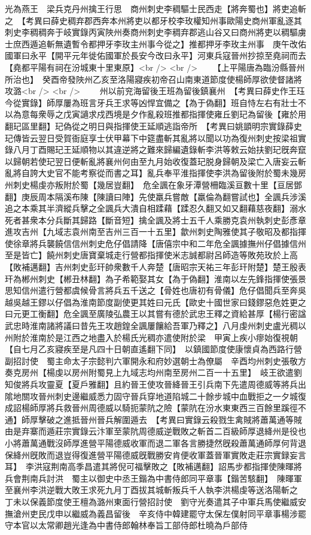 光為燕王　梁兵克丹州擒王行思　商州刺史李稠驅士民西走【將奔蜀也】將吏追斬之　【考異曰薛史稠弃郡西奔本州將吏以都牙校李玫權知州事歐陽史商州軍亂逐其刺史李稠稠奔于岐實錄丙寅陜州奏商州刺史李稠弃郡逃山谷又曰商州將吏以稠驅虜士庶西遁追斬無遺暫令都押牙李玫主州事今從之】推都押牙李玫主州事　庚午改佑國軍曰永平【開平元年徙佑國軍於長安今改曰永平】河東兵寇晉州抄掠至堯祠而去【堯都平陽有祠在汾城東十里東原】<br />
<br />
　　【上平陽唐為臨汾縣晉州所治也】　癸酉帝發陜州乙亥至洛陽寢疾初帝召山南東道節度使楊師厚欲使督諸將攻潞<br />
<br />
　　州以前兖海留後王班為留後鎮襄州　【考異曰薛史作王珏今從實錄】師厚屢為班言牙兵王求等凶悍宜備之【為于偽翻】班自恃左右有壯士不以為意每衆辱之戊寅讁求戍西境是夕作亂殺班推都指揮使雍丘劉玘為留後【雍於用翻玘區里翻】玘偽從之明日與指揮使王延順逃詣帝所　【考異曰姚顗明宗實錄薛史玘傳皆云翌日受賀衙庭享士伏甲幕下中筵盡斬其亂將以聞以功為復州刺史按梁祖實錄八月丁酉賜玘王延順物以其違逆將之難來歸編遺錄斬李洪等敕云始扶劉玘旣奔竄以歸朝若使玘翌日便斬亂將襄州何由至九月始收復蓋玘脱身歸朝及梁亡入唐妄云斬亂將自誇大史官不能考察從而書之耳】亂兵奉平淮指揮使李洪為留後附於蜀未幾房州刺史楊虔亦叛附於蜀【幾居豈翻】　危全諷在象牙潭營柵臨溪亘數十里【亘居鄧翻】庚辰周本隔溪布陳【陳讀曰陣】先使羸兵嘗敵【羸倫為翻嘗試也】全諷兵涉溪追之本乘其半濟縱兵擊之全諷兵大潰自相蹂藉【蹂忍久翻又如又翻藉慈夜翻】溺水死者甚衆本分兵斷其歸路【斷音短】擒全諷及將士五千人乘勝克袁州執刺史彭彥章進攻吉州【九域志袁州南至吉州三百一十五里】歙州刺史陶雅使其子敬昭及都指揮使徐章將兵襲饒信信州刺史危仔倡請降【唐僖宗中和二年危全諷據撫州仔倡據信州至是皆亡】饒州刺史唐寶棄城走行營都指揮使米志誠都尉呂師造等敗苑玫於上高【敗補邁翻】吉州刺史彭玕帥衆數千人奔楚【唐昭宗天祐三年彭玕附楚】楚王殷表玕為郴州刺史【郴丑林翻】為子希範娶其女【為于偽翻】淮南以左先鋒指揮使張景思知信州遣行營都虞候骨言將兵五千送之【骨姓也唐初有骨儀】危仔倡聞兵至奔吳越吳越王鏐以仔倡為淮南節度副使更其姓曰元氏【歐史十國世家曰錢鏐惡危姓更之曰元更工衡翻】危全諷至廣陵弘農王以其嘗有德於武忠王釋之資給甚厚【楊行密諡武忠時淮南諸將議曰昔先王攻趙鍠全諷屢饟給吾軍乃釋之】八月虔州刺史盧光稠以州附於淮南於是江西之地盡入於楊氏光稠亦遣使附於梁　甲寅上疾小瘳始復視朝【自七月乙亥寢疾至是凡四十日朝直遙翻下同】　以鎮國節度使康懷貞為西路行營副招討使　蜀主命太子宗懿判六軍開永和府妙選朝士為僚屬　辛酉均州刺史張敬方奏克房州【楊虔以房州附蜀見上九域志均州南至房州二百一十五里】　岐王欲遣劉知俊將兵攻靈夏【夏戶雅翻】且約晉王使攻晉絳晉王引兵南下先遣周德威等將兵出隂地關攻晉州刺史邊繼威悉力固守晉兵穿地道陷城二十餘步城中血戰拒之一夕城復成詔楊師厚將兵救晉州周德威以騎扼蒙阬之險【蒙阬在汾水東東西三百餘里蹊徑不通】師厚擊破之進抵晉州晉兵解圍遁去　【考異曰實錄云殺戮生禽賊將蕭萬通等賊由是弃寨而遁莊宗實錄云汴軍至蒙阬周德威逆戰敗之斬首二百級師厚退絳州是役也小將蕭萬通戰沒師厚進營平陽德威收軍而退二軍各言勝捷然旣殺蕭萬通師厚何背退保絳州旣敗而退豈得復進營平陽德威旣戰勝安肯便收軍蓋晉軍實敗走莊宗實録妄言耳】　李洪寇荆南高季昌遣其將倪可福擊敗之【敗補邁翻】詔馬步都指揮使陳暉將兵會荆南兵討洪　蜀主以御史中丞王鍇為中書侍郎同平章事【鍇苦駭翻】　陳暉軍至襄州李洪逆戰大敗王求死九月丁酉拔其城斬叛兵千人執李洪楊虔等送洛陽斬之　丁未以保義節度使王檀為潞州東面行營招討使　劉守光奏遣其子中軍兵馬使繼威安撫滄州吏民戊申以繼威為義昌留後　辛亥侍中韓建罷守太保左僕射同平章事楊涉罷守本官以太常卿趙光逢為中書侍郎翰林奉旨工部侍郎杜曉為戶部侍